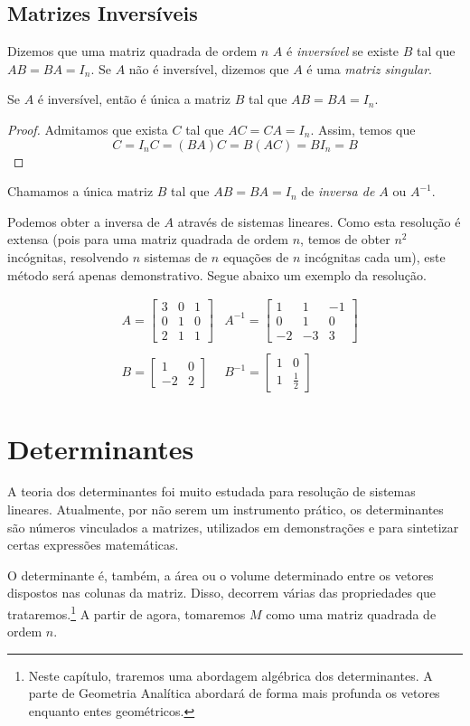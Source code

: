 \subsection{Matrizes Inversíveis}
\begin{df}
Dizemos que uma matriz quadrada de ordem $n$ $A$ é \emph{inversível} se existe $B$ tal que $AB=BA=I_n$. Se $A$ não é inversível, dizemos que $A$ é uma \emph{matriz singular}.
\end{df}
\begin{teo}
Se $A$ é inversível, então é única a matriz $B$ tal que $AB=BA=I_n$.
\begin{proof}
Admitamos que exista $C$ tal que $AC=CA=I_n$. Assim, temos que \[C=I_nC=(BA)C=B(AC)=BI_n=B\]
\end{proof}
\end{teo}
Chamamos a única matriz $B$ tal que $AB=BA=I_n$ de \emph{inversa de $A$} ou $A^{-1}$. \par 
Podemos obter a inversa de $A$ através de sistemas lineares. Como esta resolução é extensa (pois para uma matriz quadrada de ordem $n$, temos de obter $n^2$ incógnitas, resolvendo $n$ sistemas de $n$ equações de $n$ incógnitas cada um), este método será apenas demonstrativo. Segue abaixo um exemplo da resolução.
\begin{exemplo}
\begin{align*}
&A=\begin{bmatrix}
3 & 0 & 1 \\
0 & 1 & 0 \\
2 & 1 & 1
\end{bmatrix} &A^{-1}=\begin{bmatrix}
1 & 1 & -1 \\
0 & 1 & 0 \\
-2 & -3 & 3 
\end{bmatrix} \\ \\
&B=\begin{bmatrix}
1 & 0 \\ -2 & 2
\end{bmatrix} 
&B^{-1}=\begin{bmatrix}
1 & 0 \\
1 & \frac{1}{2}
\end{bmatrix}
\end{align*}
\end{exemplo}

\section{Determinantes}
A teoria dos determinantes foi muito estudada para resolução de sistemas lineares. Atualmente, por não serem um instrumento prático, os determinantes são números vinculados a matrizes, utilizados em demonstrações e para sintetizar certas expressões matemáticas. \par 
O determinante é, também, a área ou o volume determinado entre os vetores dispostos nas colunas da matriz. Disso, decorrem várias das propriedades que trataremos.\footnote{Neste capítulo, traremos uma abordagem algébrica dos determinantes. A parte de Geometria Analítica abordará de forma mais profunda os vetores enquanto entes geométricos.}
A partir de agora, tomaremos $M$ como uma matriz quadrada de ordem $n$.
